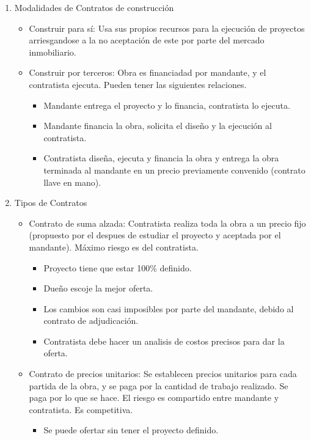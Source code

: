 \documentclass{article} %
\begin{document}
\begin{enumerate}
    \item Modalidades de Contratos de construcción
    \begin{itemize}
        \item Construir para sí: Usa sus propios recursos para la ejecución de proyectos arriesgandose a la no aceptación de este por parte del mercado inmobiliario.
        \item Construir por terceros: Obra es financiadad por mandante, y el contratista ejecuta. Pueden tener las siguientes relaciones.
        \begin{itemize}
            \item Mandante entrega el proyecto y lo financia, contratista lo ejecuta.
            \item Mandante financia la obra, solicita el diseño y la ejecución al contratista.
            \item Contratista diseña, ejecuta y financia la obra y entrega la obra terminada al mandante en
            un precio previamente convenido (contrato llave en mano).
        \end{itemize}
    \end{itemize}
    \item Tipos de Contratos
    \begin{itemize}
        \item Contrato de suma alzada: Contratista realiza toda la obra a un precio fijo (propuesto por el despues de estudiar el proyecto y aceptada por el mandante). Máximo riesgo es del contratista.
        \begin{itemize}
            \item Proyecto tiene que estar 100\% definido.
            \item Dueño escoje la mejor oferta.
            \item Los cambios son casi imposibles por parte del mandante, debido al contrato de adjudicación.
            \item Contratista debe hacer  un analisis de costos precisos para dar la oferta.
        \end{itemize}
        \item Contrato de precios unitarios: Se establecen precios unitarios para cada partida de la obra, y se paga por la cantidad de trabajo realizado. Se paga por lo que se hace. El riesgo es compartido entre mandante y contratista. Es competitiva.
        \begin{itemize}
            \item Se puede ofertar sin tener el proyecto definido.

\end{itemize}
\end{itemize}
\end{enumerate}
\end{document}
